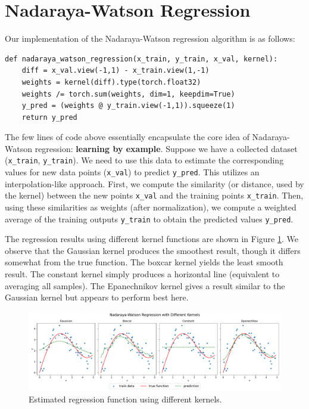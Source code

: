 \documentclass{article}
\begin{document}
\section{Nadaraya-Watson Regression}

Our implementation of the Nadaraya-Watson regression algorithm is as follows:

\begin{lstlisting}[style=python]
def nadaraya_watson_regression(x_train, y_train, x_val, kernel):
    diff = x_val.view(-1,1) - x_train.view(1,-1)
    weights = kernel(diff).type(torch.float32)
    weights /= torch.sum(weights, dim=1, keepdim=True)
    y_pred = (weights @ y_train.view(-1,1)).squeeze(1)
    return y_pred
\end{lstlisting}

The few lines of code above essentially encapsulate the core idea of Nadaraya-Watson regression: \textbf{learning by example}. Suppose we have a collected dataset (\texttt{x\_train}, \texttt{y\_train}). We need to use this data to estimate the corresponding values for new data points (\texttt{x\_val}) to predict \texttt{y\_pred}. This utilizes an interpolation-like approach. First, we compute the similarity (or distance, used by the kernel) between the new points \texttt{x\_val} and the training points \texttt{x\_train}. Then, using these similarities as weights (after normalization), we compute a weighted average of the training outputs \texttt{y\_train} to obtain the predicted values \texttt{y\_pred}.

The regression results using different kernel functions are shown in Figure \ref{fig:regression_kernels}. We observe that the Gaussian kernel produces the smoothest result, though it differs somewhat from the true function. The boxcar kernel yields the least smooth result. The constant kernel simply produces a horizontal line (equivalent to averaging all samples). The Epanechnikov kernel gives a result similar to the Gaussian kernel but appears to perform best here.

\begin{figure}[H]
    \centering
    \includegraphics[width=\textwidth]{results/regression_kernels.pdf}
    \caption{Estimated regression function using different kernels.}
    \label{fig:regression_kernels}
\end{figure}
\end{document}
